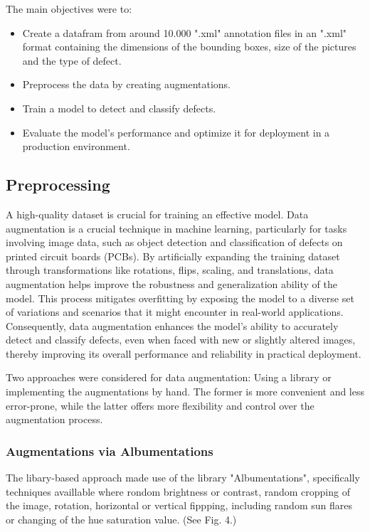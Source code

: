 \documentclass[12pt]{article}
\begin{document}
The main objectives were to:
\begin{itemize}
    \item Create a datafram from around 10.000 ".xml" annotation files in an ".xml" format containing the dimensions of the bounding boxes, size of the pictures and the type of defect.
    \item Preprocess the data by creating augmentations.
    \item Train a model to detect and classify defects.
    \item Evaluate the model's performance and optimize it for deployment in a production environment.
\end{itemize}

\subsection{Preprocessing}
A high-quality dataset is crucial for training an effective model. Data augmentation is a crucial technique in machine learning, 
particularly for tasks involving image data, such as object detection and classification of defects on printed circuit boards (PCBs). 
By artificially expanding the training dataset through transformations like rotations, flips, scaling, and translations, data augmentation 
helps improve the robustness and generalization ability of the model. This process mitigates overfitting by exposing the model to a diverse 
set of variations and scenarios that it might encounter in real-world applications. Consequently, data augmentation enhances the model's 
ability to accurately detect and classify defects, even when faced with new or slightly altered images, thereby improving its overall 
performance and reliability in practical deployment.

Two approaches were considered for data augmentation: Using a library or implementing the augmentations by hand. The former is more convenient and less error-prone, while the latter offers more flexibility and control over the augmentation process. 

\subsubsection{Augmentations via Albumentations}

The libary-based approach made use of the library "Albumentations", specifically techniques availlable where rondom brightness or contrast, random cropping of the image,
rotation, horizontal or vertical fippping, including random sun flares or changing of the hue saturation value. (See Fig. 4.)
\end{document}
